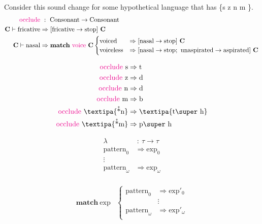 \documentclass{report}[12pt]
\begin{document}
Consider this sound change for some hypothetical language that has \{s z n m  \}.
\begin{align*}
  \text{\textcolor{magenta}{occlude}} &\ :\ \text{Consonant} \rightarrow \text{Consonant} \\
  \textbf{C} \vdash \text{fricative} & \Rightarrow [\text{fricative} \rightarrow \text{stop}]\ \textbf{C} \\
  \textbf{C} \vdash \text{nasal} & \Rightarrow \textbf{match}\ \text{\textcolor{magenta}{voice}}\ \textbf{C}
                                   \begin{cases}
                                     \text{voiced} & \Rightarrow [\text{nasal} \rightarrow \text{stop}]\ \textbf{C} \\
                                     \text{voiceless} & \Rightarrow [\text{nasal} \rightarrow \text{stop};\ \text{unaspirated} \rightarrow \text{aspirated}]\ \textbf{C} \\
                                   \end{cases}
\end{align*}

\begin{align*}
  \text{\textcolor{magenta}{occlude}}\ \text{s} & \Rightarrow \text{t} \\
  \text{\textcolor{magenta}{occlude}}\ \text{z} & \Rightarrow \text{d} \\
  \text{\textcolor{magenta}{occlude}}\ \text{n} & \Rightarrow \text{d} \\
  \text{\textcolor{magenta}{occlude}}\ \text{m} & \Rightarrow \text{b} \\
  \text{\textcolor{magenta}{occlude}}\ \text{\textipa{\r*n}} & \Rightarrow \text{\textipa{t\super h}} \\
  \text{\textcolor{magenta}{occlude}}\ \text{\textipa{\r*m}} & \Rightarrow \text{p\super h} \\
\end{align*}

\begin{align*}
  \lambda &\ :\ \tau \rightarrow \tau \\
  \text{pattern}_0 & \Rightarrow \text{exp}_0 \\
  \vdots & \\
  \text{pattern}_\omega & \Rightarrow \text{exp}_\omega \\
\end{align*}

\begin{align*}
  \textbf{match}\ \text{exp} & \begin{cases}
                                 \text{pattern}_0 & \Rightarrow \text{exp}'_0 \\
                                                  & \vdots \\
                                 \text{pattern}_\omega & \Rightarrow \text{exp}'_\omega \\
                               \end{cases}\\
\end{align*}
\end{document}
